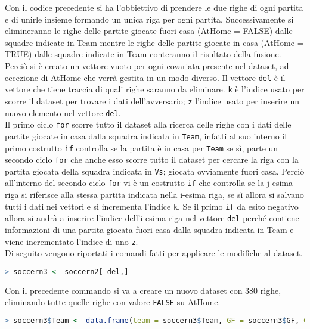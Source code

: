 Con il codice precedente si ha l'obbiettivo di prendere le due righe di ogni partita e di unirle insieme formando un unica riga per ogni partita. Successivamente si elimineranno le righe delle partite giocate fuori casa (\textsf{AtHome} = FALSE) dalle squadre indicate in \textsf{Team} mentre le righe delle partite giocate in casa (\textsf{AtHome} = TRUE) dalle squadre indicate in \textsf{Team} conteranno il risultato della fusione.\\
Perciò si è creato un vettore vuoto per ogni covariata presente nel dataset, ad eccezione di \textsf{AtHome} che verrà gestita in un modo diverso. Il vettore \texttt{del} è il vettore che tiene traccia di quali righe saranno da eliminare. \texttt{k} è l'indice usato per scorre il dataset per trovare i dati dell'avversario; \texttt{z} l'indice usato per inserire un nuovo elemento nel vettore \texttt{del}.\\
Il primo ciclo \texttt{for} scorre tutto il dataset alla ricerca delle righe con i dati delle partite giocate in casa dalla squadra indicata in \texttt{Team}, infatti al suo interno il primo costrutto \texttt{if} controlla se la partita è in casa per \texttt{Team} se sì, parte un secondo ciclo \texttt{for} che anche esso scorre tutto il dataset per cercare la riga con la partita giocata della squadra indicata in \texttt{Vs}; giocata ovviamente fuori casa. Perciò all'interno del secondo ciclo \texttt{for} vi è un costrutto \texttt{if} che controlla se la j-esima riga si riferisce alla stessa partita indicata nella i-esima riga, se sì allora si salvano tutti i dati nei vettori e si incrementa l'indice \texttt{k}. Se il primo \texttt{if} da esito negativo allora si andrà a inserire l'indice dell'i-esima riga nel vettore \texttt{del} perché contiene informazioni di una partita giocata fuori casa dalla squadra indicata in \textsf{Team} e viene incrementato l'indice di uno \texttt{z}.\\

Di seguito vengono riportati i comandi fatti per applicare le modifiche al dataset.
\bigskip
\begin{lstlisting}[language=R]
> soccern3 <- soccern2[-del,]
\end{lstlisting}
\bigskip
\bigskip
Con il precedente commando si va a creare un nuovo dataset con 380 righe, eliminando tutte quelle righe con valore \texttt{FALSE} su \textsf{AtHome}. 
\bigskip
\begin{lstlisting}[language=R]
> soccern3$Team <- data.frame(team = soccern3$Team, GF = soccern3$GF, GA = soccern3$GA,  at.home = 1, Poss = soccern3$Poss, Sh = soccern3$Sh, SoT = soccern3$SoT, G.Sh = soccern3$G.Sh, PAtt = soccern3$PAtt, PCmp. = soccern3$PCmp., SPAtt = soccern3$SPAtt, SPCmp. = soccern3$SPCmp., MPAtt = soccern3$MPAtt, MPCmp. = soccern3$MPCmp., LPAtt = soccern3$LPAtt, LPCmp. = soccern3$LPCmp., ToDef3rd = soccern3$ToDef3rd, ToAtt3rd = soccern3$ToAtt3rd, ToAttPen = soccern3$ToAttPen, TotDist = soccern3$TotDist, Fls = soccern3$Fls, Fld = soccern3$Fld, Crs = soccern3$Crs, Int = soccern3$Int, TklWin = soccern3$TklWin, Recov = soccern3$Recov)
\end{lstlisting}

